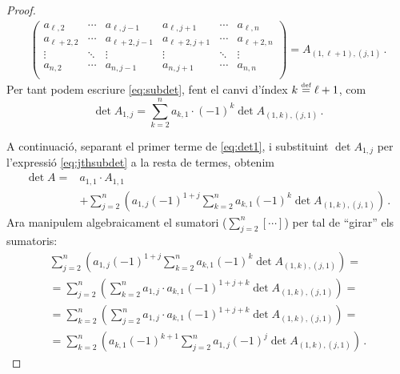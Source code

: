 \begin{s-lema}
\begin{proof}
\begin{equation*}
\begin{split}
\begin{pmatrix}
		a_{\ell,2}&\cdots&a_{\ell,j-1}&a_{\ell,j+1}&\cdots& a_{\ell,n}\\
		a_{\ell+2,2}&\cdots&a_{\ell+2,j-1}&a_{\ell+2,j+1}&\cdots&	a_{\ell+2,n}\\
		\vdots&	\ddots&	\vdots&	\vdots&	\ddots&		\vdots\\
		a_{n,2}&   \cdots&	a_{n,j-1}&	a_{n,j+1}&\cdots&a_{n,n}\\
		\end{pmatrix} = A_{(1,\ell+1),(j,1)}
		\,.
		\end{split}
		\end{equation*}
		Per tant podem escriure \eqref{eq:subdet}, fent el canvi d'índex $k\stackrel{\text{\tiny def}}{=} \ell+1$, com 
		\begin{equation}\label{eq:jthsubdet}
		\det A_{1,j} = \sum_{k=2}^{n} a_{k,1}\cdot(-1)^{k}\det A_{(1,k),(j,1)}\,.
		\end{equation}
		
		A continuació, separant el primer terme de \eqref{eq:det1}, i substituint $\det A_{1,j}$ per l'expressió \eqref{eq:jthsubdet} a la resta de termes, obtenim
		\begin{equation}\label{eq:parrafada}
		\begin{split}
		\det A ={}& a_{1,1}\cdot A_{1,1} \\
		&+\sum_{j=2}^{n} \left(a_{1,j} (-1)^{1+j}  \sum_{k=2}^{n} a_{k,1} (-1)^{k} \det A_{(1,k),(j,1)}\right)\,.
		\end{split}
		\end{equation}
		Ara manipulem algebraicament el sumatori  ($\sum_{j=2}^n [\cdots]$) per tal de ``girar'' els sumatoris:
		\begin{multline}\label{eq:sumofjth}
		\sum_{j=2}^{n} \left(a_{1,j} (-1)^{1+j}  \sum_{k=2}^{n} a_{k,1} (-1)^{k} \det A_{(1,k),(j,1)}\right)=\\
		=\sum_{j=2}^{n} \left(  \sum_{k=2}^{n} a_{1,j}\cdot a_{k,1} (-1)^{1+j+k} \det A_{(1,k),(j,1)}\right)=\\
		=\sum_{k=2}^{n} \left(  \sum_{j=2}^{n} a_{1,j}\cdot a_{k,1} (-1)^{1+j+k} \det A_{(1,k),(j,1)}\right)=\\
		=\sum_{k=2}^{n} \left(a_{k,1} (-1)^{k+1}  \sum_{j=2}^{n} a_{1,j} (-1)^{j} \det A_{(1,k),(j,1)}\right)\,.
		\end{multline}
		

\end{proof}
\end{s-lema}
